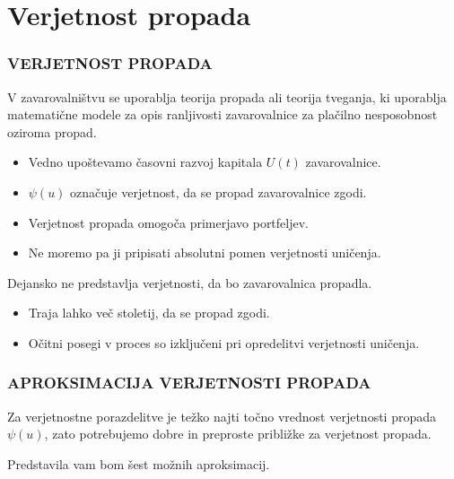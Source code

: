 \documentclass{beamer}
\begin{document}
\section{Verjetnost propada}
\begin{frame}
	\frametitle{VERJETNOST PROPADA}
	\begin{alertblock}{}
		V zavarovalništvu se uporablja teorija propada ali teorija tveganja, ki uporablja matematične modele za opis ranljivosti zavarovalnice za plačilno nesposobnost oziroma propad.
	\end{alertblock}

	\begin{itemize}
	\item<1->Vedno upoštevamo časovni razvoj kapitala $U(t)$ zavarovalnice.
	\item<2->$\psi(u)$ označuje verjetnost, da se propad zavarovalnice zgodi.
	\end{itemize}
\end{frame}

\begin{frame}
	\begin{itemize}
		\item<1->Verjetnost propada omogoča primerjavo portfeljev.
		\item<1->Ne moremo pa ji pripisati absolutni pomen verjetnosti uničenja.
	\end{itemize}
\vspace{0.5cm}
	\begin{alertblock}{}
		Dejansko ne predstavlja verjetnosti, da bo zavarovalnica propadla.
	\end{alertblock}
	\begin{itemize}
		\item Traja lahko več stoletij, da se propad zgodi.
		\item Očitni posegi v proces so izključeni pri opredelitvi verjetnosti uničenja.
	\end{itemize}
\end{frame}

\begin{frame}
	\frametitle{APROKSIMACIJA VERJETNOSTI PROPADA}
	\begin{alertblock}{}
		Za verjetnostne porazdelitve je težko najti točno vrednost verjetnosti propada $\psi(u)$, zato potrebujemo dobre in preproste približke za verjetnost propada.
	\end{alertblock}

Predstavila vam bom šest možnih aproksimacij.
\end{frame}
\end{document}
